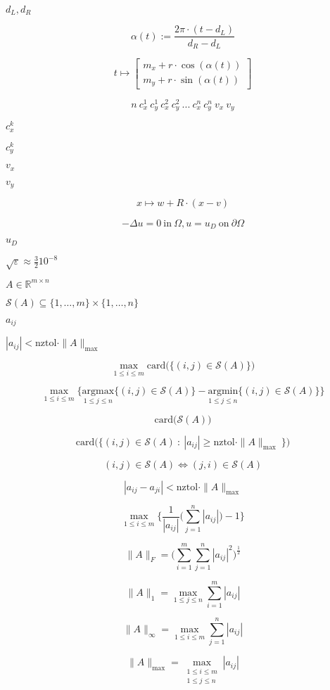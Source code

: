 \documentclass{article}
\begin{document}
$d_L, d_R$
\pagebreak

\[\alpha(t) := \frac{2\pi\cdot(t-d_L)}{d_R-d_L}\]
\pagebreak

\[t \mapsto \begin{bmatrix} m_x + r\cdot\cos(\alpha(t))\\ m_y + r\cdot\sin(\alpha(t))\end{bmatrix}\]
\pagebreak

\[ n~ c^1_x~ c^1_y~ c^2_x~ c^2_y~ ...~ c^n_x~ c^n_y~ v_x~ v_y\]
\pagebreak

$c^k_x$
\pagebreak

$c^k_y$
\pagebreak

$v_x$
\pagebreak

$v_y$
\pagebreak

\[ x \mapsto w + R \cdot(x - v)\]
\pagebreak

\[ - \Delta u = 0 ~ \mathrm{in} ~ \Omega, u = u_D ~\mathrm{on}~ \partial \Omega \]
\pagebreak

$ u_D $
\pagebreak

$\sqrt{\varepsilon}\approx \frac{3}{2} 10^{-8}$
\pagebreak

$A\in \mathbb{R}^{m\times n}$
\pagebreak

$\mathcal{S}(A) \subseteq \{1,\dots,m\}\times\{1,\dots,n\}$
\pagebreak

$a_{ij}$
\pagebreak

$|a_{ij}| < \mathrm{nztol}\cdot\|A\|_{\max}$
\pagebreak

\[\max_{1\leq i\leq m}\mathrm{card}\Big(\big\{(i,j)\in\mathcal{S}(A)\big\}\Big)\]
\pagebreak

\[\max_{1\leq i\leq m}\Big\{ \underset{1\leq j\leq n}{\mathrm{argmax}}\big\{(i,j)\in\mathcal{S}(A)\big\}
- \underset{1\leq j\leq n}{\mathrm{argmin}}\big\{(i,j)\in\mathcal{S}(A)\big\}\Big\}\]
\pagebreak

\[\mathrm{card}\Big(\mathcal{S}(A)\Big)\]
\pagebreak

\[\mathrm{card}\Big(\big\{(i,j)\in\mathcal{S}(A)~:~|a_{ij}| \geq \mathrm{nztol}\cdot\|A\|_{\max}~\big\}\Big)\]
\pagebreak

\[(i,j)\in\mathcal{S}(A) \Longleftrightarrow (j,i)\in\mathcal{S}(A)\]
\pagebreak

\[|a_{ij} - a_{ji}| < \mathrm{nztol}\cdot\|A\|_{\max}\]
\pagebreak

\[ \max_{1\leq i\leq m} \Big\{\frac{1}{|a_{ij}|}\Big(\sum_{j=1}^n |a_{ij}|\Big)-1\Big\}\]
\pagebreak

\[\|A\|_F = \Big(\sum_{i=1}^m\sum_{j=1}^n |a_{ij}|^2\Big)^{\frac{1}{2}}\]
\pagebreak

\[\|A\|_1 = \max_{1\leq j\leq n} \sum_{i=1}^m |a_{ij}|\]
\pagebreak

\[\|A\|_\infty = \max_{1\leq i\leq m} \sum_{j=1}^n |a_{ij}|\]
\pagebreak

\[\|A\|_{\max} = \max_{\substack{1\leq i\leq m\\1\leq j\leq n}} |a_{ij}|\]
\pagebreak
\end{document}
